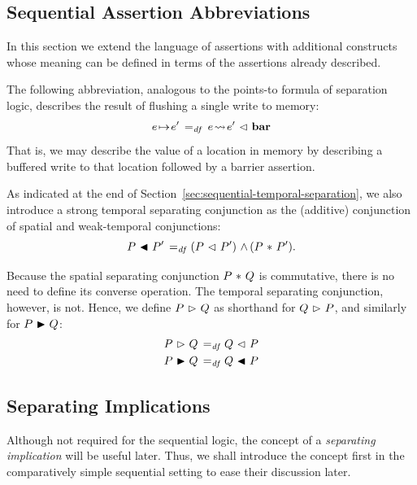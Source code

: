\documentclass[11pt]{report}         %
\begin{document}
\subsection{Sequential Assertion Abbreviations}
\label{sec:uniprocessor-abbreviations} 

In this section we extend the language of assertions with additional constructs whose meaning can be defined in terms of the assertions already described. 

The following abbreviation, analogous to the points-to formula of separation logic, describes the result of flushing a single write to memory: \[
    e \!\mapsto\! e' \operatorname{\;=_{\mathit{df}}\;} e \!\leadsto\! e' \operatorname{\,\vartriangleleft\,} \mathbf{bar} \] That is, we may describe the value of a location in memory by describing a buffered write to that location followed by a barrier assertion. 

As indicated at the end of Section~\ref{sec:sequential-temporal-separation}, we also introduce a strong temporal separating conjunction as the (additive) conjunction of spatial and weak-temporal conjunctions: \[ P \operatorname{\,\blacktriangleleft\,} P' \operatorname{\;=_{\mathit{df}}\;} (P \operatorname{\,\vartriangleleft\,} P') \operatorname{\,\wedge\,} (P \operatorname{\,\ast\,} P').\]

Because the spatial separating conjunction $P \operatorname{\,\ast\,} Q$ is commutative, there is no need to define its converse operation. The temporal separating conjunction, however, is not. Hence, we define $P \operatorname{\,\vartriangleright\,} Q$ as shorthand for $Q \operatorname{\,\vartriangleright\,} P$, and similarly for $P \operatorname{\,\blacktriangleright\,} Q$: \begin{align*}
  P \operatorname{\,\vartriangleright\,} Q \operatorname{\;=_{\mathit{df}}\;} & Q \operatorname{\,\vartriangleleft\,} P \\ 
  P \operatorname{\,\blacktriangleright\,} Q \operatorname{\;=_{\mathit{df}}\;} & Q \operatorname{\,\blacktriangleleft\,} P \\ 
\end{align*}

\subsection{Separating Implications}
\label{sec:separating-implications}

Although not required for the sequential logic, the concept of a \emph{separating implication} will be useful later. Thus, we shall introduce the concept first in the comparatively simple sequential setting to ease their discussion later.
\end{document}

